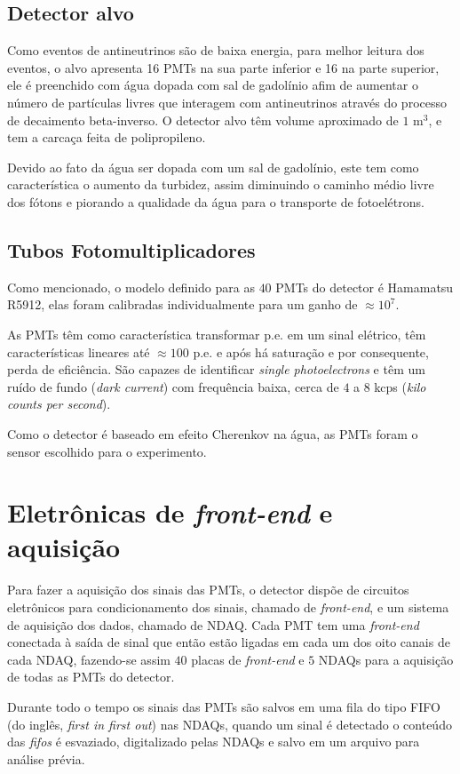 \subsection{Detector alvo}

Como eventos de antineutrinos são de baixa energia, para melhor leitura dos eventos, o alvo apresenta 16 PMTs na sua parte inferior e 16 na parte superior, ele é preenchido com água dopada com sal de gadolínio afim de aumentar o número de partículas livres que interagem com antineutrinos através do processo de decaimento beta-inverso. O detector alvo têm volume aproximado de $1$ m$^3$, e tem a carcaça feita de polipropileno.


Devido ao fato da água ser dopada com um sal de gadolínio, este tem como característica o aumento da turbidez, assim diminuindo o caminho médio livre dos fótons e piorando a qualidade da água para o transporte de fotoelétrons.

\subsection{Tubos Fotomultiplicadores} \label{subsec:pmt}

Como mencionado, o modelo definido para as $40$ PMTs do detector é Hamamatsu R5912, elas foram calibradas individualmente para um ganho de $\approx10^7$.

As PMTs têm como característica transformar  \ac{p.e.} em um sinal elétrico, têm características lineares até $\approx 100$ p.e. \cite{BABICZ2019554} e após há saturação e por consequente, perda de eficiência. São capazes de identificar \emph{single photoelectrons} e têm um ruído de fundo (\emph{dark current}) com frequência baixa, cerca de $4$ a $8$ kcps (\emph{kilo counts per second}). 

Como o detector é baseado em efeito Cherenkov na água, as PMTs foram o sensor escolhido para o experimento.


\section{Eletrônicas de \emph{front-end} e aquisição}

Para fazer a aquisição dos sinais das PMTs, o detector dispõe de circuitos eletrônicos para condicionamento dos sinais, chamado de \emph{front-end}, e um sistema de aquisição dos dados, chamado de \ac{NDAQ}. Cada PMT tem uma \emph{front-end} conectada à saída de sinal que então estão ligadas em cada um dos oito canais de cada NDAQ, fazendo-se assim $40$ placas de \emph{front-end} e $5$ NDAQs para a aquisição de todas as PMTs do detector.

Durante todo o tempo os sinais das PMTs são salvos em uma fila do tipo FIFO (do inglês, \emph{first in first out}) nas NDAQs, quando um sinal é detectado o conteúdo das \emph{fifos} é esvaziado, digitalizado pelas NDAQs e salvo em um arquivo para análise prévia.

